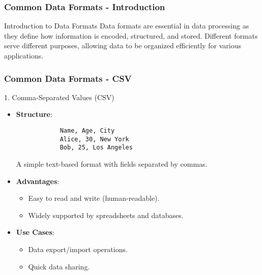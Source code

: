 \documentclass[aspectratio=169]{beamer}
\begin{document}
\begin{frame}[fragile]
    \frametitle{Common Data Formats - Introduction}
    \begin{block}{Introduction to Data Formats}
        Data formats are essential in data processing as they define how information is encoded, structured, and stored. Different formats serve different purposes, allowing data to be organized efficiently for various applications.
    \end{block}
\end{frame}

\begin{frame}[fragile]
    \frametitle{Common Data Formats - CSV}
    \begin{block}{1. Comma-Separated Values (CSV)}
        \begin{itemize}
            \item \textbf{Structure}:
            \begin{lstlisting}
            Name, Age, City
            Alice, 30, New York
            Bob, 25, Los Angeles
            \end{lstlisting}
            A simple text-based format with fields separated by commas.

            \item \textbf{Advantages}:
            \begin{itemize}
                \item Easy to read and write (human-readable).
                \item Widely supported by spreadsheets and databases.
            \end{itemize}

            \item \textbf{Use Cases}:
            \begin{itemize}
                \item Data export/import operations.
                \item Quick data sharing.
            \end{itemize}
        \end{itemize}
    \end{block}
\end{frame}
\end{document}
